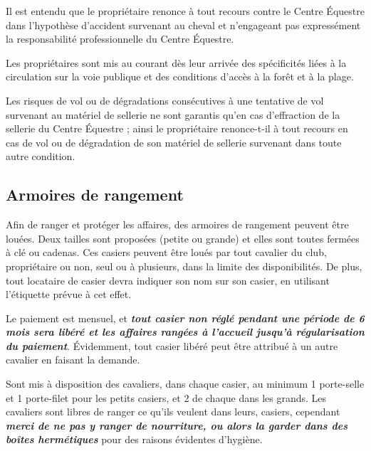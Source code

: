 \documentclass[11pt,a4paper]{article}
\begin{document}
Il est entendu que le propriétaire renonce à tout recours contre le Centre Équestre dans l'hypothèse d'accident survenant au cheval et n'engageant pas expressément la responsabilité professionnelle du Centre Équestre.

Les propriétaires sont mis au courant dès leur arrivée des spécificités liées à la circulation sur la voie publique et des conditions d'accès à la forêt et à la plage.

Les risques de vol ou de dégradations consécutives à une tentative de vol survenant au matériel de sellerie ne sont garantis qu'en cas d'effraction de la sellerie du Centre Équestre ; ainsi le propriétaire renonce-t-il à tout recours en cas de vol ou de dégradation de son matériel de sellerie survenant dans toute autre condition.


\subsection{Armoires de rangement}

Afin de ranger et protéger les affaires, des armoires de rangement peuvent être louées. Deux tailles sont proposées (petite ou grande) et elles sont toutes fermées à clé ou cadenas. Ces \og casiers \fg{} peuvent être loués par tout cavalier du club, propriétaire ou non, seul ou à plusieurs, dans la limite des disponibilités. De plus, tout locataire de casier devra indiquer son nom sur son casier, en utilisant l'étiquette prévue à cet effet.

Le paiement est mensuel, et \textit{\textbf{tout casier non réglé pendant une période de 6 mois sera libéré et les affaires rangées à l'accueil jusqu'à régularisation du paiement}}. Évidemment, tout casier libéré peut être attribué à un autre cavalier en faisant la demande.

Sont mis à disposition des cavaliers, dans chaque casier, au minimum 1 porte-selle et 1 porte-filet pour les petits casiers, et 2 de chaque dans les grands. Les cavaliers sont libres de ranger ce qu'ils veulent dans leurs, casiers, cependant \textit{\textbf{merci de ne pas y ranger de nourriture, ou alors la garder dans des boîtes hermétiques}} pour des raisons évidentes d'hygiène.
\end{document}
